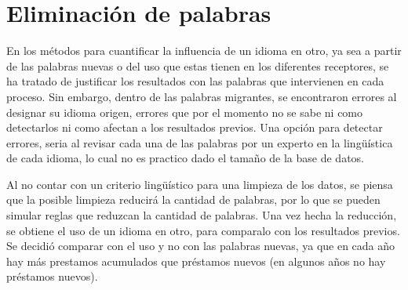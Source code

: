 \chapter{Eliminación de palabras}

En los métodos para cuantificar la influencia de un idioma en otro, ya sea a partir de las palabras nuevas o del uso que estas tienen en los diferentes receptores, se ha tratado de justificar los resultados con las palabras que intervienen en cada proceso. Sin embargo, dentro de las palabras migrantes, se encontraron errores al designar su idioma origen, errores que por el momento no se sabe ni como detectarlos ni como afectan a los resultados previos.  Una opción para detectar errores, seria al revisar cada una de las palabras por un experto en la lingüística de cada idioma, lo cual no es practico dado el tamaño de la base de datos.

Al no contar con un criterio lingüístico para una limpieza de los datos, se piensa que la posible limpieza reducirá la cantidad de palabras, por lo que se pueden simular reglas  que reduzcan la cantidad de palabras.  Una vez hecha la reducción, se obtiene el uso de un idioma en otro, para comparalo con los resultados previos. Se decidió comparar con el uso y no con las palabras nuevas, ya que en cada año hay más prestamos acumulados que préstamos nuevos (en algunos años no hay préstamos nuevos).
 



